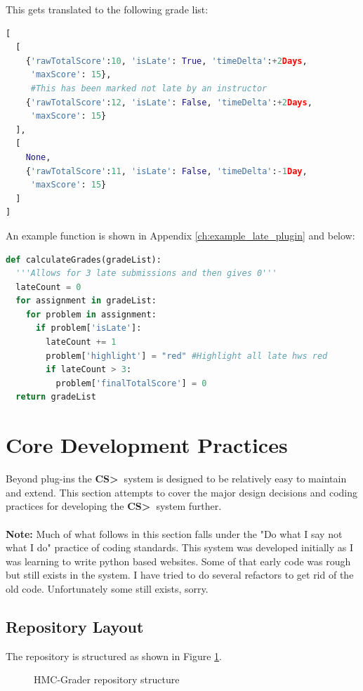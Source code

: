 \documentclass[11pt]{report}
\newcommand{\csgt}[0]{\textbf{CS\textgreater\ }}
\begin{document}
This gets translated to the following grade list:
\begin{lstlisting}[language=Python]
[
  [
    {'rawTotalScore':10, 'isLate': True, 'timeDelta':+2Days, 
     'maxScore': 15},
     #This has been marked not late by an instructor
    {'rawTotalScore':12, 'isLate': False, 'timeDelta':+2Days, 
     'maxScore': 15}
  ],
  [
    None,
    {'rawTotalScore':11, 'isLate': False, 'timeDelta':-1Day, 
     'maxScore': 15}
  ]
]
\end{lstlisting}

An example function is shown in Appendix \ref{ch:example_late_plugin} and below:

\begin{lstlisting}[language=Python]
def calculateGrades(gradeList):
  '''Allows for 3 late submissions and then gives 0'''
  lateCount = 0
  for assignment in gradeList:
    for problem in assignment:
      if problem['isLate']:
        lateCount += 1
        problem['highlight'] = "red" #Highlight all late hws red
        if lateCount > 3:
          problem['finalTotalScore'] = 0
  return gradeList
\end{lstlisting}


\section{Core Development Practices}
Beyond plug-ins the \csgt system is designed to be relatively easy to maintain and extend. 
This section attempts to cover the major design decisions and coding practices for developing
the \csgt system further. 
\\
\\
\noindent\textbf{Note: } Much of what follows in this section falls under the "Do what I say not
what I do" practice of coding standards. This system was developed initially as I was learning
to write python based websites. Some of that early code was rough but still exists in the system.
I have tried to do several refactors to get rid of the old code. Unfortunately some still exists,
sorry.

\subsection{Repository Layout}
The repository is structured as shown in Figure \ref{fig:repository_structure}.

\begin{figure}
\caption{HMC-Grader repository structure}
\label{fig:repository_structure}
\end{figure}
\end{document}
